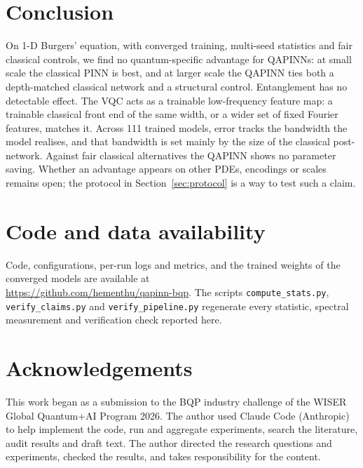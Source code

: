 \documentclass[11pt]{article}
\begin{document}
\section{Conclusion}
On 1-D Burgers' equation, with converged training, multi-seed statistics and fair
classical controls, we find no quantum-specific advantage for QAPINNs: at small scale
the classical PINN is best, and at larger scale the QAPINN ties both a depth-matched
classical network and a structural control. Entanglement has no detectable effect. The
VQC acts as a trainable low-frequency feature map: a trainable classical front end of the
same width, or a wider set of fixed Fourier features, matches it. Across 111 trained
models, error tracks the bandwidth the model realises, and that bandwidth is set mainly
by the size of the classical post-network. Against fair classical alternatives the
QAPINN shows no parameter saving. Whether an advantage
appears on other PDEs, encodings or scales remains open; the protocol in
Section~\ref{sec:protocol} is a way to test such a claim.

\section*{Code and data availability}
Code, configurations, per-run logs and metrics, and the trained weights of the
converged models are available at\\ \url{https://github.com/hementhu/qapinn-bqp}. The scripts
\texttt{compute\_stats.py}, \texttt{verify\_claims.py} and \texttt{verify\_pipeline.py}
regenerate every statistic, spectral measurement and verification check reported here.

\section*{Acknowledgements}
This work began as a submission to the BQP industry challenge of the WISER Global
Quantum+AI Program 2026. The author used Claude Code (Anthropic) to help implement
the code, run and aggregate experiments, search the literature, audit results and
draft text. The author directed the research questions and experiments, checked the
results, and takes responsibility for the content.
\end{document}
